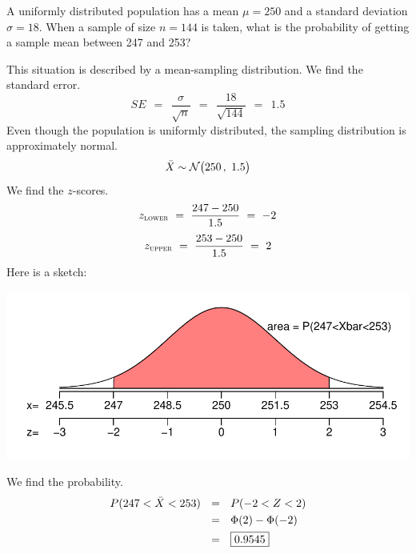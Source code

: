 \documentclass[12pt,letterpaper,addpoints]{exam}
\begin{document}
\begin{questions}


\newpage


\question[10] A uniformly distributed population has a mean $\mu=250$ and a standard deviation $\sigma=18$. When a sample of size $n=144$ is taken, what is the probability of getting a sample mean between 247 and 253?
\begin{solution}
This situation is described by a mean-sampling distribution. We find the standard error.
$$SE ~~=~~ \frac{\sigma}{\sqrt{n}} ~~=~~ \frac{18}{\sqrt{144}} ~~=~~ 1.5$$
Even though the population is uniformly distributed, the sampling distribution is approximately normal.
$$\bar{X} \sim \mathcal{N}\big(250\,,~1.5\big) $$
We find the $z$-scores.
$$z_\textsc{lower} ~=~ \frac{247-250}{1.5} ~=~ -2$$
$$z_\textsc{upper} ~=~ \frac{253-250}{1.5} ~=~ 2$$
Here is a sketch:
\begin{center}
\includegraphics[scale=1]{figures/sketch13.pdf}
\end{center}
We find the probability.
\begin{align*}
P(247 < \bar{X} < 253) ~~&=~~ P(-2 < Z < 2)\\
&=~~ \Phi(2)-\Phi(-2) \\
&=~~ \fbox{0.9545}
\end{align*}
\end{solution}
\newpage



\end{questions}
\end{document}
